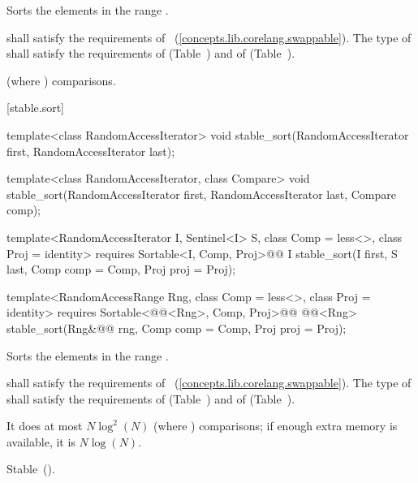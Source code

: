 \begin{itemdescr}
\pnum
\effects
Sorts the elements in the range
.

\begin{removedblock}
\pnum
\requires
{} shall satisfy the requirements of
~(\ref{concepts.lib.corelang.swappable}). The type
of  shall satisfy the requirements of
 (Table~) and of
 (Table~).
\end{removedblock}

\pnum
\complexity
{}
(where
)
comparisons.
\end{itemdescr}

[stable.sort]{}

%
\begin{removedblock}
\begin{itemdecl}
template<class RandomAccessIterator>
  void stable_sort(RandomAccessIterator first, RandomAccessIterator last);

template<class RandomAccessIterator, class Compare>
  void stable_sort(RandomAccessIterator first, RandomAccessIterator last,
                   Compare comp);
\end{itemdecl}
\end{removedblock}
\begin{addedblock}
\begin{itemdecl}
template<RandomAccessIterator I, Sentinel<I> S, class Comp = less<>,
    class Proj = identity>
  requires Sortable<I, Comp, Proj>@\newtxt{()}@
  I stable_sort(I first, S last, Comp comp = Comp{}, Proj proj = Proj{});

template<RandomAccessRange Rng, class Comp = less<>, class Proj = identity>
  requires Sortable<@@<Rng>, Comp, Proj>@\newtxt{()}@
  @@<Rng>
    stable_sort(Rng&@\newtxt{\&}@ rng, Comp comp = Comp{}, Proj proj = Proj{});
\end{itemdecl}
\end{addedblock}

\begin{itemdescr}
\pnum
\effects
Sorts the elements in the range .

\begin{removedblock}
\pnum
\requires
{} shall satisfy the requirements of
~(\ref{concepts.lib.corelang.swappable}). The type
of  shall satisfy the requirements of
 (Table~) and of
 (Table~).
\end{removedblock}

\pnum
\complexity
It does at most $N \log^2(N)$
(where
)
comparisons; if enough extra memory is available, it is
$N \log(N)$.

\pnum
\remarks Stable~().
\end{itemdescr}

